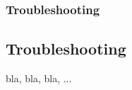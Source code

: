 \begin{frame}
	\frametitle{Troubleshooting}
	\subsection{Troubleshooting}
	
	bla, bla, bla, ...
\end{frame}
